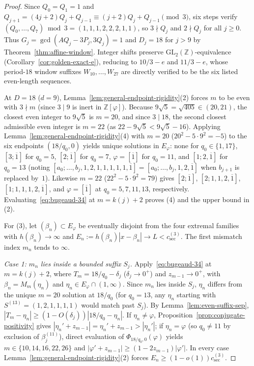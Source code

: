 \documentclass[11pt]{amsart}
\theoremstyle{definition}
\theoremstyle{remark}
\numberwithin{equation}{section}
\newcommand{\Z}{\mathbb{Z}}
\begin{document}
\begin{proof}
Since $Q_0=Q_1=1$ and $Q_{j+1}=(4j+2)Q_j+Q_{j-1}\equiv(j+2)Q_j+Q_{j-1}\pmod3$,
six steps verify $(Q_0,\ldots,Q_7)\bmod3=(1,1,1,2,2,2,1,1)$, so $3\nmid Q_j$
and $2\nmid Q_j$ for all $j\ge0$. Thus $G_j=\gcd(AQ_j-3P_j,3Q_j)=1$ and
$D_j=18$ for $j>9$ by Theorem~\ref{thm:affine-window}. Integer shifts preserve
$\mathrm{GL}_2(\Z)$-equivalence (Corollary~\ref{cor:golden-exact-e}), reducing
to $10/3-e$ and $11/3-e$, whose period-$18$ window suffixes $W_{10},\ldots,W_{27}$
are directly verified to be the six listed even-length sequences.

At $D=18$ ($d=9$), Lemma~\ref{lem:general-endpoint-rigidity}(2) forces $m$ to
be even with $3\nmid m$ (since $3\mid 9$ is inert in $\Z[\varphi]$). Because
$9\sqrt5=\sqrt{405}\in(20,21)$, the closest even integer to $9\sqrt5$ is $m=20$,
and since $3\mid 18$, the second closest admissible even integer is $m=22$
(as $22-9\sqrt5<9\sqrt5-16$). Applying Lemma~\ref{lem:general-endpoint-rigidity}(4)
with $m=20$ ($20^2-5\cdot9^2=-5$) to the six endpoints $(18/q_0,0)$ yields
unique solutions in $E_\varphi$: none for $q_0\in\{1,17\}$, $[3;\overline1]$
for $q_0=5$, $[2;\overline1]$ for $q_0=7$, $\varphi=[\overline1]$ for $q_0=11$,
and $[1;2,\overline1]$ for $q_0=13$ (noting $[a_0;\ldots,b_j,1,2,1,1,1,1,1,\overline1]=[a_0;\ldots,b_j,1,2,\overline1]$
when $b_{j+1}$ is replaced by~$1$). Likewise $m=22$ ($22^2-5\cdot9^2=79$)
gives $[2;\overline1]$, $[2;1,1,2,\overline1]$, $[1;1,1,1,2,\overline1]$, and
$\varphi=[\overline1]$ at $q_0=5,7,11,13$, respectively. Evaluating~\eqref{eq:bugeaud-34}
at $m=k(j)+2$ proves (4) and the upper bound in (2).

For (3), let $(\beta_n)\subset E_\varphi$ be eventually disjoint from the four
extremal families with $h(\beta_n)\to\infty$ and $E_n:=h(\beta_n)|x-\beta_n|\to L<c_{\mathrm{sec}}^{(3)}$.
The first mismatch index $m_n$ tends to $\infty$.

\emph{Case 1: $m_n$ lies inside a bounded suffix $S_j$.}
Apply~\eqref{eq:bugeaud-34} at $m=k(j)+2$, where $T_m=18/q_0-\delta_j$
($\delta_j\to0^+$) and $z_{m-1}\to0^+$, with $\beta_n=M_m(\eta_n)$ and
$\eta_n\in E_\varphi\cap(1,\infty)$. Since $m_n$ lies inside $S_j$, $\eta_n$
differs from the unique $m=20$ solution at $18/q_0$ (for $q_0=13$, any
$\eta_n$ starting with $S^{(13)}=(1,2,1,1,1,1)$ would match past $S_j$).
By Lemma~\ref{lem:even-suffix-sep}, $|T_m-\eta_n|\ge(1-O(\delta_j))|18/q_0-\eta_n|$.
If $\eta_n\ne\varphi$, Proposition~\ref{prop:conjugate-positivity} gives
$|\eta_n'+z_{m-1}|=\eta_n'+z_{m-1}>|\eta_n'|$; if $\eta_n=\varphi$ (so
$q_0\ne11$ by exclusion of $\beta_j^{(11)}$), direct evaluation of
$\Phi_{18/q_0,0}(\varphi)$ yields $m\in\{10,14,16,22,26\}$ and
$|\varphi'+z_{m-1}|\ge(1-2z_{m-1})|\varphi'|$. In every case
Lemma~\ref{lem:general-endpoint-rigidity}(2) forces $E_n\ge(1-o(1))c_{\mathrm{sec}}^{(3)}$.


\end{proof}
\end{document}
